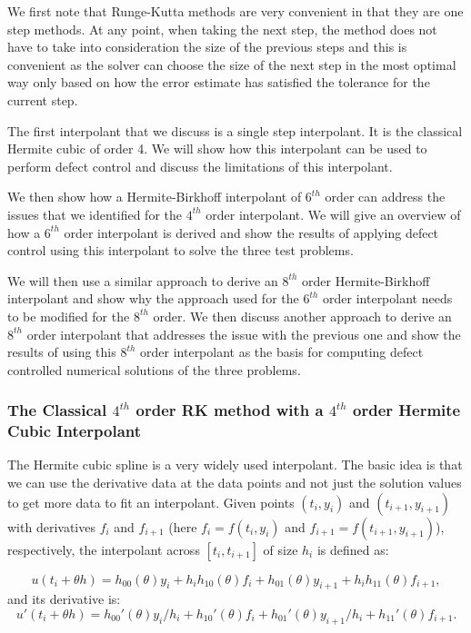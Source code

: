 \documentclass{article}
\begin{document}
We first note that Runge-Kutta methods are very convenient in that they are one step methods. At any point, when taking the next step, the method does not have to take into consideration the size of the previous steps and this is convenient as the solver can choose the size of the next step in the most optimal way only based on how the error estimate has satisfied the tolerance for the current step. 

The first interpolant that we discuss is a single step interpolant. It is the classical Hermite cubic of order 4. We will show how this interpolant can be used to perform defect control and discuss the limitations of this interpolant. 

We then show how a Hermite-Birkhoff interpolant of $6^{th}$ order can address the issues that we identified for the $4^{th}$ order interpolant. We will give an overview of how a $6^{th}$ order interpolant is derived and show the results of applying defect control using this interpolant to solve the three test problems. 

We will then use a similar approach to derive an $8^{th}$ order Hermite-Birkhoff interpolant and show why the approach used for the $6^{th}$ order interpolant needs to be modified for the $8^{th}$ order. We then discuss another approach to derive an $8^{th}$ order interpolant that addresses the issue with the previous one and show the results of using this $8^{th}$ order interpolant as the basis for computing defect controlled numerical solutions of the three problems.


\subsubsection{The Classical $4^{th}$ order RK method with a $4^{th}$ order Hermite Cubic Interpolant}
The Hermite cubic spline is a very widely used interpolant. The basic idea is that we can use the derivative data at the data points and not just the solution values to get more data to fit an interpolant. Given points $(t_i, y_i)$ and $(t_{i + 1}, y_{i + 1})$ with derivatives $f_i$ and $f_{i + 1}$ (here $f_i = f(t_i, y_i)$ and $f_{i+1}=f(t_{i+1}, y_{i+1})$), respectively, the interpolant across $[t_i, t_{i + 1}]$ of size $h_i$ is defined as:

\begin{equation}
\label{eqn:HB4}
u(t_i + \theta h) = h_{00}(\theta)y_i +  h_ih_{10}(\theta)f_i + h_{01}(\theta)y_{i + 1} + h_ih_{11}(\theta)f_{i + 1}, 
\end{equation}
and its derivative is:
\begin{equation}
u'(t_i + \theta h) = h_{00}'(\theta)y_i/h_i +  h_{10}'(\theta)f_i + h_{01}'(\theta)y_{i + 1}/h_i + h_{11}'(\theta)f_{i + 1}. 
\end{equation}
\end{document}
